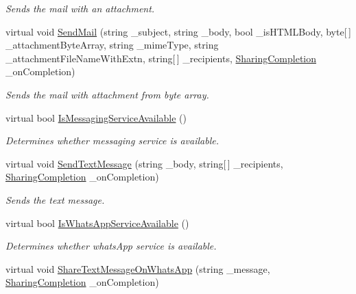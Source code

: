 \begin{DoxyCompactItemize}
\begin{DoxyCompactList}\small\item\em Sends the mail with an attachment. \end{DoxyCompactList}\item 
virtual void \hyperlink{class_voxel_busters_1_1_native_plugins_1_1_sharing_a1496ade3df6459558df6af74b7720586}{Send\+Mail} (string \+\_\+subject, string \+\_\+body, bool \+\_\+is\+H\+T\+M\+L\+Body, byte\mbox{[}$\,$\mbox{]} \+\_\+attachment\+Byte\+Array, string \+\_\+mime\+Type, string \+\_\+attachment\+File\+Name\+With\+Extn, string\mbox{[}$\,$\mbox{]} \+\_\+recipients, \hyperlink{class_voxel_busters_1_1_native_plugins_1_1_sharing_a61017c6d51721d2ca6154ffef15a6555}{Sharing\+Completion} \+\_\+on\+Completion)
\begin{DoxyCompactList}\small\item\em Sends the mail with attachment from byte array. \end{DoxyCompactList}\item 
virtual bool \hyperlink{class_voxel_busters_1_1_native_plugins_1_1_sharing_a3cb0c12e4ab7e9a69abc6ed91655390b}{Is\+Messaging\+Service\+Available} ()
\begin{DoxyCompactList}\small\item\em Determines whether messaging service is available. \end{DoxyCompactList}\item 
virtual void \hyperlink{class_voxel_busters_1_1_native_plugins_1_1_sharing_a29e06cab4855b89d410aa764d155e7c6}{Send\+Text\+Message} (string \+\_\+body, string\mbox{[}$\,$\mbox{]} \+\_\+recipients, \hyperlink{class_voxel_busters_1_1_native_plugins_1_1_sharing_a61017c6d51721d2ca6154ffef15a6555}{Sharing\+Completion} \+\_\+on\+Completion)
\begin{DoxyCompactList}\small\item\em Sends the text message. \end{DoxyCompactList}\item 
virtual bool \hyperlink{class_voxel_busters_1_1_native_plugins_1_1_sharing_a26a9c7408fead70cecf3a383d8fec9ae}{Is\+Whats\+App\+Service\+Available} ()
\begin{DoxyCompactList}\small\item\em Determines whether whats\+App service is available. \end{DoxyCompactList}\item 
virtual void \hyperlink{class_voxel_busters_1_1_native_plugins_1_1_sharing_a426c8b69ba0df9aca3741678abe7882a}{Share\+Text\+Message\+On\+Whats\+App} (string \+\_\+message, \hyperlink{class_voxel_busters_1_1_native_plugins_1_1_sharing_a61017c6d51721d2ca6154ffef15a6555}{Sharing\+Completion} \+\_\+on\+Completion)

\end{DoxyCompactItemize}
